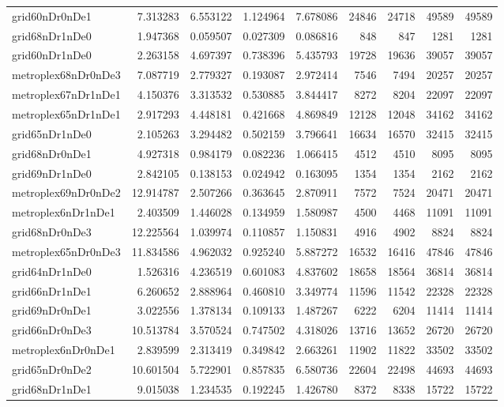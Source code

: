 \begin{longtable}{|l|r|r|r|r|r|r|r|r|}
grid60nDr0nDe1 & 7.313283 & 6.553122 & 1.124964 & 7.678086 & 24846 & 24718 & 49589 & 49589 \\
grid68nDr1nDe0 & 1.947368 & 0.059507 & 0.027309 & 0.086816 & 848 & 847 & 1281 & 1281 \\
grid60nDr1nDe0 & 2.263158 & 4.697397 & 0.738396 & 5.435793 & 19728 & 19636 & 39057 & 39057 \\
metroplex68nDr0nDe3 & 7.087719 & 2.779327 & 0.193087 & 2.972414 & 7546 & 7494 & 20257 & 20257 \\
metroplex67nDr1nDe1 & 4.150376 & 3.313532 & 0.530885 & 3.844417 & 8272 & 8204 & 22097 & 22097 \\
metroplex65nDr1nDe1 & 2.917293 & 4.448181 & 0.421668 & 4.869849 & 12128 & 12048 & 34162 & 34162 \\
grid65nDr1nDe0 & 2.105263 & 3.294482 & 0.502159 & 3.796641 & 16634 & 16570 & 32415 & 32415 \\
grid68nDr0nDe1 & 4.927318 & 0.984179 & 0.082236 & 1.066415 & 4512 & 4510 & 8095 & 8095 \\
grid69nDr1nDe0 & 2.842105 & 0.138153 & 0.024942 & 0.163095 & 1354 & 1354 & 2162 & 2162 \\
metroplex69nDr0nDe2 & 12.914787 & 2.507266 & 0.363645 & 2.870911 & 7572 & 7524 & 20471 & 20471 \\
metroplex6nDr1nDe1 & 2.403509 & 1.446028 & 0.134959 & 1.580987 & 4500 & 4468 & 11091 & 11091 \\
grid68nDr0nDe3 & 12.225564 & 1.039974 & 0.110857 & 1.150831 & 4916 & 4902 & 8824 & 8824 \\
metroplex65nDr0nDe3 & 11.834586 & 4.962032 & 0.925240 & 5.887272 & 16532 & 16416 & 47846 & 47846 \\
grid64nDr1nDe0 & 1.526316 & 4.236519 & 0.601083 & 4.837602 & 18658 & 18564 & 36814 & 36814 \\
grid66nDr1nDe1 & 6.260652 & 2.888964 & 0.460810 & 3.349774 & 11596 & 11542 & 22328 & 22328 \\
grid69nDr0nDe1 & 3.022556 & 1.378134 & 0.109133 & 1.487267 & 6222 & 6204 & 11414 & 11414 \\
grid66nDr0nDe3 & 10.513784 & 3.570524 & 0.747502 & 4.318026 & 13716 & 13652 & 26720 & 26720 \\
metroplex6nDr0nDe1 & 2.839599 & 2.313419 & 0.349842 & 2.663261 & 11902 & 11822 & 33502 & 33502 \\
grid65nDr0nDe2 & 10.601504 & 5.722901 & 0.857835 & 6.580736 & 22604 & 22498 & 44693 & 44693 \\
grid68nDr1nDe1 & 9.015038 & 1.234535 & 0.192245 & 1.426780 & 8372 & 8338 & 15722 & 15722 \\

\end{longtable}
